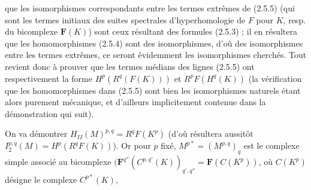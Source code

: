 que les isomorphismes correspondants entre les termes extrêmes de (2.5.5)
(qui sont les termes initiaux des suites spectrales d'hyperhomologie de $F$
pour $K$, resp. du bicomplexe $\mathbf F(K)$) sont ceux résultant des formules
(2.5.3) ; il en résultera que les homomorphismes (2.5.4) sont des
isomorphismes, d'oû des isomorphismes entre les termes extrêmes, ce seront
évidemment les isomorphismes cherchés. Tout revient donc à prouver que les
termes médians des lignes (2.5.5) ont respectivement la forme
$H^p(R^q(F(K)))$ et $R^pF(H^q(K))$ (la vérification que les homomorphismes
dans (2.5.5) sont bien les isomorphismes naturels étant alors purement
mécanique, et d'ailleurs implicitement contenue dans la démonstration qui
suit).

On va démontrer $H_{II}(M)^{p,q}=R^qF(K^p)$ (d'oû résultera aussitôt
$ I_2^{p,q}(M)=H^p(R^qF(K))$). Or pour $p$ fixé,
$M^{p*}=(M^{p,q})_q$ est le complexe simple associé au bicomplexe
$(\mathbf F^{q''}(C^{p,q'}(K))_{q',q''}=\mathbf F(C(K^p))$,
où $C(K^p)$ désigne le complexe $C^{p*}(K)$,


